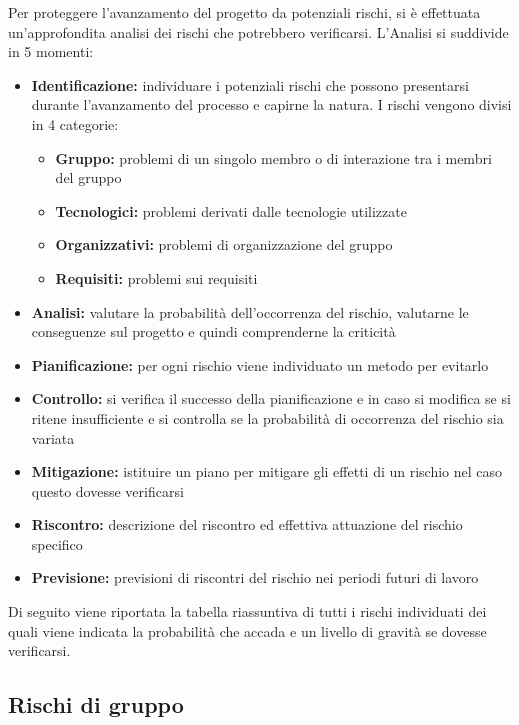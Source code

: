 \documentclass[12pt,a4paper]{article}
\begin{document}
Per proteggere l’avanzamento del progetto da potenziali rischi, si è effettuata un’approfondita analisi dei rischi che potrebbero verificarsi. L’Analisi si suddivide in 5 momenti:
\begin{itemize}
	\item \textbf{Identificazione:} individuare i potenziali rischi che possono presentarsi durante l’avanzamento del processo e capirne la natura. I rischi vengono divisi in 4 categorie:
	\begin{itemize}
		\item \textbf{Gruppo:} problemi di un singolo membro o di interazione tra i membri del gruppo
		\item \textbf{Tecnologici:} problemi derivati dalle tecnologie utilizzate
		\item \textbf{Organizzativi:} problemi di organizzazione del gruppo
		\item \textbf{Requisiti:} problemi sui requisiti
	\end{itemize}
	\item \textbf{Analisi:} valutare la probabilità dell’occorrenza del rischio, valutarne le conseguenze sul progetto e quindi comprenderne la criticità
	\item \textbf{Pianificazione:} per ogni rischio viene individuato un metodo per evitarlo
	\item \textbf{Controllo:} si verifica il successo della pianificazione e in caso si modifica se si ritene insufficiente e si controlla se la probabilità di occorrenza del rischio sia variata
	\item \textbf{Mitigazione:} istituire un piano per mitigare gli effetti di un rischio nel caso questo dovesse verificarsi
	\item \textbf{Riscontro:} descrizione del riscontro ed effettiva attuazione del rischio specifico
	\item \textbf{Previsione:} previsioni di riscontri del rischio nei periodi futuri di lavoro
\end{itemize}
Di seguito viene riportata la tabella riassuntiva di tutti i rischi individuati dei quali viene indicata la probabilità che accada e un livello di gravità se dovesse verificarsi.

\subsection{Rischi di gruppo}
\end{document}
